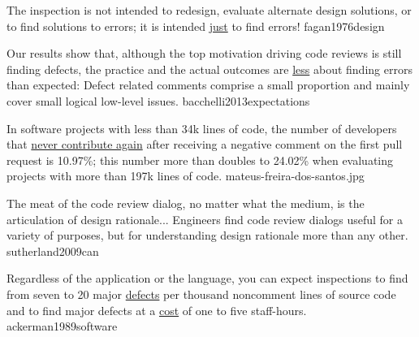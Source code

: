 \documentclass{article}
\begin{document}


%



  {The inspection is not intended to redesign, evaluate alternate design solutions, or to find solutions to errors; it is intended \ul{just} to find errors!}
  {fagan1976design}

  {Our results show that, although the top motivation driving code reviews is still finding defects, the practice and the actual outcomes are \ul{less} about finding errors than expected: Defect related comments comprise a small proportion and mainly cover small logical low-level issues.}
  {bacchelli2013expectations}

  {In software projects with less than 34k lines of code, the number of developers that \ul{never contribute again} after receiving a negative comment on the first pull request is 10.97\%; this number more than doubles to 24.02\% when evaluating projects with more than 197k lines of code.}
  {mateus-freira-dos-santos.jpg}

  {The meat of the code review dialog, no matter what the medium, is the articulation of design rationale... Engineers find code review dialogs useful for a variety of purposes, but for understanding design rationale more than any other.}
  {sutherland2009can}

  {Regardless of the application or the language, you can expect inspections to find from seven to 20 major \ul{defects} per thousand noncomment lines of source code and to find major defects at a \ul{cost} of one to five staff-hours.}
  {ackerman1989software}
\end{document}
